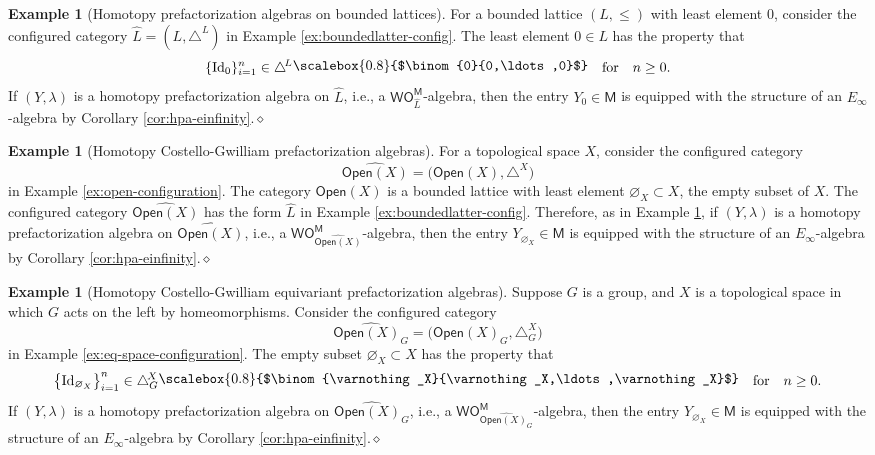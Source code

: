 \documentclass{amsbook}
\numberwithin{section}{chapter}
\numberwithin{subsection}{section}
\numberwithin{equation}{section}
\theoremstyle{plain}
\theoremstyle{definition}
\newtheorem{example}[equation]{Example}
\newcommand{\M}{\mathsf{M}}
\renewcommand{\O}{\mathsf{O}}
\newcommand{\Otom}{\O^{\M}}
\newcommand{\W}{\mathsf{W}}
\newcommand{\Id}{\mathrm{Id}}
\newcommand{\dqed}{\hfill$\diamond$}
\newcommand{\Config}{\triangle} %
\newcommand{\Configl}{\Config^{\! L}}
\newcommand{\Configx}{\Config^{\! X}}
\newcommand{\Configxg}{\Configx_G}
\newcommand{\Lhat}{\widehat{L}}
\newcommand{\Open}{\mathsf{Open}}
\newcommand{\Openx}{\Open(X)}
\newcommand{\Openxhat}{\widehat{\Openx}}
\newcommand{\Openxg}{\Openx_G}
\newcommand{\Openxghat}{\widehat{\Openxg}}
\newcommand{\wom}{\W\Otom}
\newcommand{\wolhatm}{\wom_{\Lhat}}
\newcommand{\smallprof}[1]
{\raisebox{.05cm}{\scalebox{0.8}{#1}}}
\newcommand{\sbinom}[2]{\raisebox{.05cm}{\scalebox{0.8}{$\binom{#1}{#2}$}}}
\newcommand{\zerozerozero}{\smallprof{$\binom{0}{0,\ldots,0}$}}
\newcommand{\forspace}{\quad\text{for}\quad}
\begin{document}
\begin{example}[Homotopy prefactorization algebras on bounded lattices]\label{ex:hpa-einfinity-lattice} 
For a bounded lattice $(L,\leq)$ with least element $0$, consider the configured category $\Lhat = (L,\Configl)$ in Example \ref{ex:boundedlatter-config}.  The least element $0 \in L$ has the property that \[\{\Id_0\}_{i=1}^n \in \Configl\zerozerozero \forspace n\geq 0.\]  If $(Y,\lambda)$ is a homotopy prefactorization algebra on $\Lhat$, i.e., a $\wolhatm$-algebra, then the entry $Y_0 \in \M$ is equipped with the structure of an $E_\infty$-algebra by Corollary \ref{cor:hpa-einfinity}.\dqed
\end{example}

\begin{example}[Homotopy Costello-Gwilliam prefactorization algebras]\label{ex:hpa-einfinity-cg}
For a topological space $X$, consider the configured category \[\Openxhat =\bigl(\Openx,\Configx\bigr)\] in Example \ref{ex:open-configuration}.  The category $\Openx$ is a bounded lattice with least element $\varnothing_X \subset X$, the empty subset of $X$.  The configured category $\Openxhat$ has the form $\Lhat$ in Example \ref{ex:boundedlatter-config}.  Therefore, as in Example \ref{ex:hpa-einfinity-lattice}, if $(Y,\lambda)$ is a homotopy prefactorization algebra on $\Openxhat$, i.e., a $\wom_{\Openxhat}$-algebra, then the entry $Y_{\varnothing_X} \in \M$ is equipped with the structure of an $E_\infty$-algebra by Corollary \ref{cor:hpa-einfinity}.\dqed
\end{example}

\begin{example}[Homotopy Costello-Gwilliam equivariant prefactorization algebras]\label{ex:hpa-einfinty-cgeq}
Suppose $G$ is a group, and $X$ is a topological space in which $G$ acts on the left by homeomorphisms.  Consider the configured category \[\Openxghat =\bigl(\Openxg,\Configxg\bigr)\] in Example \ref{ex:eq-space-configuration}.  The empty subset $\varnothing_X \subset X$ has the property that \[\bigl\{\Id_{\varnothing_X}\bigr\}_{i=1}^n \in \Configxg\sbinom{\varnothing_X}{\varnothing_X,\ldots,\varnothing_X} \forspace n\geq 0.\] If $(Y,\lambda)$ is a homotopy prefactorization algebra on $\Openxghat$, i.e., a $\wom_{\Openxghat}$-algebra, then the entry $Y_{\varnothing_X} \in \M$ is equipped with the structure of an $E_\infty$-algebra by Corollary \ref{cor:hpa-einfinity}.\dqed
\end{example}
\end{document}
